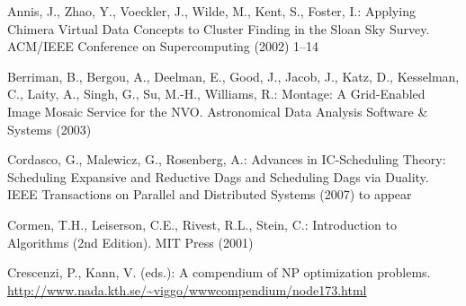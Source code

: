 \documentclass[letterpaper,11pt]{article}
\newcommand{\remove}[1]{}
\newcommand{\FF}{\vspace*{\medskipamount}}
\begin{document}
\begin{thebibliography}{99}
\FF

\remove{****************
\bibitem{AMSK04}
Ali, S., Maciejewski, A.A., Siegel, H.J., Kim, J.-K.:
Measuring the robustness of a resource allocation.
IEEE Transactions on Parallel and Distributed Systems.
Vol. 15(7) (2004) 630--641
**************}

Annis, J., Zhao, Y., Voeckler, J., Wilde, M., Kent, S.,
Foster, I.: Applying Chimera Virtual Data Concepts to
Cluster Finding in the Sloan Sky Survey. ACM/IEEE
Conference on Supercomputing (2002) 1--14

Berriman, B., Bergou, A., Deelman, E., Good, J., Jacob, J., Katz, D., Kesselman, C., Laity, A., Singh, G., Su, M.-H., Williams, R.:
Montage: A Grid-Enabled Image Mosaic Service for the NVO.
Astronomical Data Analysis Software \& Systems (2003)

\remove{************
\bibitem{CW79}
Carter, J.L., Wegman, M.N.:
Universal classes of hash functions.
Journal of Computer and System Sciences, 
Vol. 18(2) (1979) 143--154

\bibitem{Dagman}
Condor Manual, Condor Team, University of Wisconsin-Madison
{\small \url{http://www.cs.wisc.edu/condor/manual/v6.7/2_11DAGMan_Applications.html}} (2004)
************}

\remove{
\bibitem{Cook74}
Cook, S.A.: 
An observation on time-storage tradeoff.
Journal of Computer and System Sciences, 
Vol.~9 (1974) 308--316
}

Cordasco, G., Malewicz, G., Rosenberg, A.:
Advances in IC-Scheduling Theory: Scheduling Expansive and Reductive Dags and Scheduling Dags via Duality. IEEE Transactions on Parallel and Distributed Systems (2007) to appear 

Cormen, T.H., Leiserson, C.E., Rivest, R.L., Stein, C.: Introduction to Algorithms (2nd Edition). MIT Press (2001)

Crescenzi, P., Kann, V. (eds.):
A compendium of NP optimization problems.
{\small\url{http://www.nada.kth.se/~viggo/wwwcompendium/node173.html}} 

\remove{************
\bibitem{CHM97}
Czech, Z.J., Havas, G., Majewski, B.S.:
Perfect hashing, Fundamental Study.
Theoretical Computer Science, Vol.182 (1997) 1--143

\bibitem{DKMMRT94}
Dietzfelbinger, M., Karlin, A., Mehlhorn, K., Meyer auf der Heide, F., Rohnert, H., Tarjan, R.E.:
Dynamic Perfect Hashing: Upper and Lower Bounds.
SIAM Journal on Computing, Vol. 23(4) (1994) 738--761
************}


\end{thebibliography}
\end{document}
